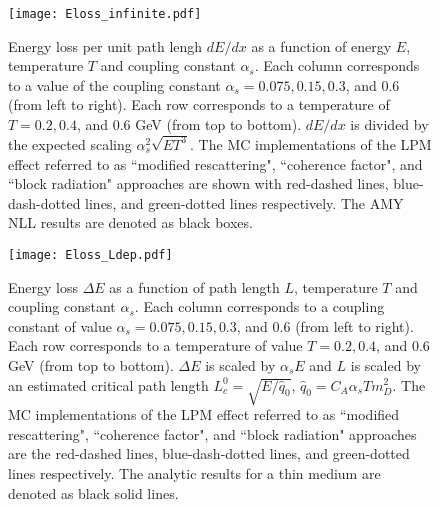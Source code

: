 \begin{figure}
\centering
\texttt{[image: Eloss\_infinite.pdf]}
\caption{Energy loss per unit path lengh $dE/dx$ as a function of energy $E$, temperature $T$ and coupling constant $\alpha_s$. Each column corresponds to a value of the coupling constant $\alpha_s = 0.075, 0.15, 0.3$, and $0.6$ (from left to right). Each row corresponds to a temperature of $T = 0.2, 0.4$, and $0.6$ GeV (from top to bottom). $dE/dx$ is divided by the expected scaling $\alpha_s^2 \sqrt{ET^3}$. The MC implementations of the LPM effect referred to as ``modified rescattering", ``coherence factor", and ``block radiation" approaches are shown with red-dashed lines, blue-dash-dotted lines, and green-dotted lines respectively. The AMY NLL results are denoted as black boxes.}
\label{fig:eloss-inf}
\end{figure}

\begin{figure}
\centering
\texttt{[image: Eloss\_Ldep.pdf]}
\caption{Energy loss $\Delta E$ as a function of path length $L$, temperature $T$ and coupling constant $\alpha_s$. Each column corresponds to a coupling constant of value $\alpha_s = 0.075, 0.15, 0.3$, and $0.6$ (from left to right). Each row corresponds to a temperature of value $T = 0.2, 0.4$, and $0.6$ GeV (from top to bottom). $\Delta E$ is scaled by $\alpha_s E$ and $L$ is scaled by an estimated critical path length $L_c^0 = \sqrt{E/\hat{q}_0}$, $\hat{q}_0 = C_A \alpha_s T m_D^2$. The MC implementations of the LPM effect referred to as ``modified rescattering", ``coherence factor", and ``block radiation" approaches are the red-dashed lines, blue-dash-dotted lines, and green-dotted lines respectively. The analytic results for a thin medium are denoted as black solid lines.}
\label{fig:eloss-ldep}
\end{figure}

